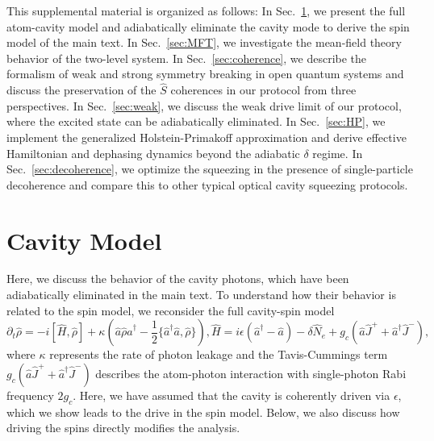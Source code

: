 

This supplemental material is organized as follows: In Sec.~\ref{sec:cavity}, we present the full atom-cavity model and adiabatically eliminate the cavity mode to derive the spin model of the main text. In Sec.~\ref{sec:MFT}, we investigate the mean-field theory behavior of the two-level system. In Sec.~\ref{sec:coherence}, we describe the formalism of weak and strong symmetry breaking in open quantum systems and discuss the preservation of the $\hat S$ coherences in our protocol from three perspectives.  
In Sec.~\ref{sec:weak}, we discuss the weak drive limit of our protocol, where the excited state can be adiabatically eliminated. In Sec.~\ref{sec:HP}, we implement the generalized Holstein-Primakoff approximation and derive effective Hamiltonian and dephasing dynamics beyond the adiabatic $\delta$ regime. In Sec.~\ref{sec:decoherence}, we optimize the squeezing in the presence of single-particle decoherence and compare this to other typical optical cavity squeezing protocols. 

\section{Cavity Model}
\label{sec:cavity}

Here, we discuss the behavior of the cavity photons, which have been adiabatically eliminated in the main text. To understand how their behavior is related to the spin model, we reconsider the full cavity-spin model
\begin{subequations}
\begin{equation}
    \partial_t \hat \rho = -i [\hat H, \hat \rho] + \kappa (\hat a \hat \rho \hat a^\dagger - \frac{1}{2} \{ \hat a^\dagger \hat a, \hat \rho \}),
\end{equation}
\begin{equation}
    \hat H = i \epsilon (\hat a^\dagger - \hat a) - \delta \hat N_e + g_c (\hat a \hat J^+ + \hat a^\dagger \hat J^-),
\end{equation}
\end{subequations}
where $\kappa$ represents the rate of photon leakage and the Tavis-Cummings term $g_c (\hat a \hat J^+ + \hat a^\dagger \hat J^-)$ describes the atom-photon interaction with single-photon Rabi frequency $2 g_c$. Here, we have assumed that the cavity is coherently driven via $\epsilon$, which we show leads to the drive in the spin model. Below, we also discuss how driving the spins directly modifies the analysis.

